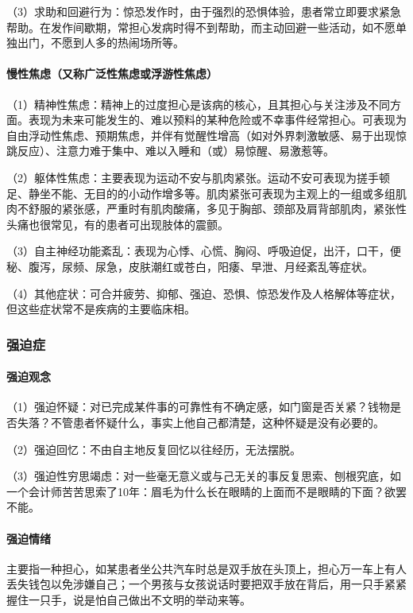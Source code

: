 （3）求助和回避行为：惊恐发作时，由于强烈的恐惧体验，患者常立即要求紧急帮助。在发作间歇期，常担心发病时得不到帮助，而主动回避一些活动，如不愿单独出门，不愿到人多的热闹场所等。
\paragraph{慢性焦虑（又称广泛性焦虑或浮游性焦虑）}

（1）精神性焦虑：精神上的过度担心是该病的核心，且其担心与关注涉及不同方面。表现为未来可能发生的、难以预料的某种危险或不幸事件经常担心。可表现为自由浮动性焦虑、预期焦虑，并伴有觉醒性增高（如对外界刺激敏感、易于出现惊跳反应）、注意力难于集中、难以入睡和（或）易惊醒、易激惹等。

（2）躯体性焦虑：主要表现为运动不安与肌肉紧张。运动不安可表现为搓手顿足、静坐不能、无目的的小动作增多等。肌肉紧张可表现为主观上的一组或多组肌肉不舒服的紧张感，严重时有肌肉酸痛，多见于胸部、颈部及肩背部肌肉，紧张性头痛也很常见，有的患者可出现肢体的震颤。

（3）自主神经功能紊乱：表现为心悸、心慌、胸闷、呼吸迫促，出汗，口干，便秘、腹泻，尿频、尿急，皮肤潮红或苍白，阳痿、早泄、月经紊乱等症状。

（4）其他症状：可合并疲劳、抑郁、强迫、恐惧、惊恐发作及人格解体等症状，但这些症状常不是疾病的主要临床相。

\subsubsection{强迫症}
\paragraph{强迫观念}

（1）强迫怀疑：对已完成某件事的可靠性有不确定感，如门窗是否关紧？钱物是否失落？不管患者怀疑什么，事实上他自己都清楚，这种怀疑是没有必要的。

（2）强迫回忆：不由自主地反复回忆以往经历，无法摆脱。

（3）强迫性穷思竭虑：对一些毫无意义或与己无关的事反复思索、刨根究底，如一个会计师苦苦思索了10年：眉毛为什么长在眼睛的上面而不是眼睛的下面？欲罢不能。
\paragraph{强迫情绪}

主要指一种担心，如某患者坐公共汽车时总是双手放在头顶上，担心万一车上有人丢失钱包以免涉嫌自己；一个男孩与女孩说话时要把双手放在背后，用一只手紧紧握住一只手，说是怕自己做出不文明的举动来等。
